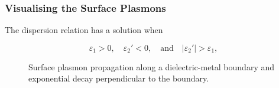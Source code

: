 \documentclass[10pt, compress]{beamer}
\newcommand{\E}{\varepsilon}  %
\begin{document}
\begin{frame}
  \frametitle{Visualising the Surface Plasmons}
  \begin{outline}
    \1 The dispersion relation has a solution when 
  \end{outline}
    \begin{equation*}
    \E_1 > 0, \quad    \E_2' < 0, \quad   \text{and}  \quad \left| \E_2' \right| > \E_1,
  \end{equation*}
  \begin{figure}[b!]
  \centering
  \def\svgwidth{.75\linewidth}
  
  \caption*{Surface plasmon propagation along a dielectric-metal boundary and exponential decay perpendicular to the boundary.}
\end{figure}
\end{frame}
\end{document}
